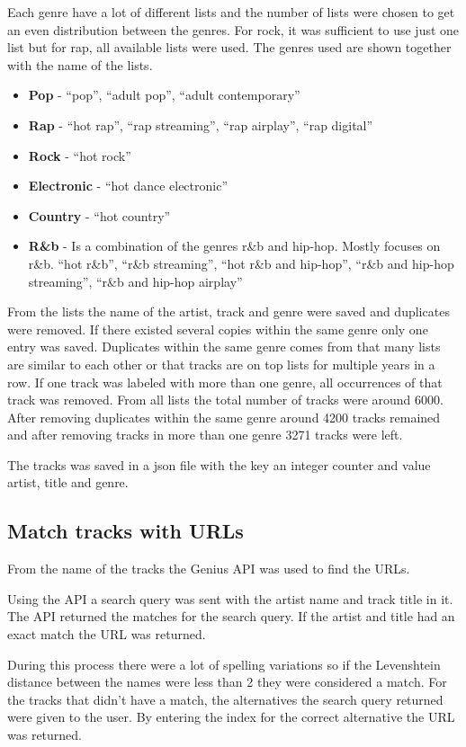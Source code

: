 \documentclass[a4paper, 12pt]{article}
\begin{document}
Each genre have a lot of different lists and the number of lists were chosen to get an even distribution between the genres. For rock, it was sufficient to use just one list but for rap, all available lists were used.
The genres used are shown together with the name of the lists.
\begin{itemize}
    \item {\textbf{Pop} - ``pop'', ``adult pop'', ``adult contemporary''}
    \item {\textbf{Rap} - ``hot rap'', ``rap streaming'', ``rap airplay'', ``rap digital''}
    \item {\textbf{Rock} - ``hot rock''}
    \item {\textbf{Electronic} - ``hot dance electronic''}
    \item {\textbf{Country} - ``hot country''}
    \item {\textbf{R\&b} - Is a combination of the genres r\&b and hip-hop. Mostly focuses on r\&b. ``hot r\&b'', ``r\&b streaming'', ``hot r\&b and hip-hop'', ``r\&b and hip-hop streaming'', ``r\&b and hip-hop airplay''}
\end{itemize}

From the lists the name of the artist, track and genre were saved and duplicates were removed.
If there existed several copies within the same genre only one entry was saved.
Duplicates within the same genre comes from that many lists are similar to each other or that tracks are on top lists for multiple years in a row.
If one track was labeled with more than one genre, all occurrences of that track was removed.
From all lists the total number of tracks were around 6000.
After removing duplicates within the same genre around 4200 tracks remained and after removing tracks in more than one genre 3271 tracks were left.

The tracks was saved in a json file with the key an integer counter and value artist, title and genre.

\subsection{Match tracks with URLs}
From the name of the tracks the Genius API was used to find the URLs. \cite{genius}

Using the API a search query was sent with the artist name and track title in it.
The API returned the matches for the search query.
If the artist and title had an exact match the URL was returned.

During this process there were a lot of spelling variations so if the Levenshtein distance between the names were less than 2 they were considered a match.
For the tracks that didn't have a match, the alternatives the search query returned were given to the user.
By entering the index for the correct alternative the URL was returned.
\end{document}
